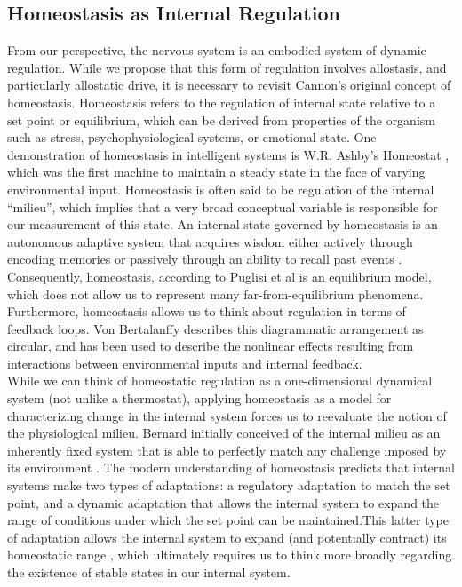 \documentclass{sigchi}
\begin{document}
\subsection{Homeostasis as Internal Regulation}
From our perspective, the nervous system is an embodied system of dynamic regulation. While we propose that this form of regulation involves allostasis, and particularly allostatic drive, it is necessary to revisit Cannon’s \cite{Cannon:1930:TWB} original concept of homeostasis. Homeostasis refers to the regulation of internal state relative to a set point or equilibrium, which can be derived from properties of the organism such as stress, psychophysiological systems, or emotional state. One demonstration of homeostasis in intelligent systems is W.R. Ashby’s Homeostat \cite{Ashby:1960:DFB}, which was the first machine to maintain a steady state in the face of varying environmental input.  Homeostasis is often said to be regulation of the internal “milieu”, which implies that a very broad conceptual variable is responsible for our measurement of this state. An internal state governed by homeostasis is an autonomous adaptive system that acquires wisdom either actively through encoding memories or passively through an ability to recall past events \cite{Dworkin:1993:LPR}.  Consequently, homeostasis, according to Puglisi et al \cite{puglisi} is an equilibrium model, which does not allow us to represent many far-from-equilibrium phenomena. Furthermore, homeostasis allows us to think about regulation in terms of feedback loops. Von Bertalanffy \cite{Bertalanffy:1968:GST} describes this diagrammatic arrangement as circular, and has been used to describe the nonlinear effects resulting from interactions between environmental inputs and internal feedback.\\
While we can think of homeostatic regulation as a one-dimensional dynamical system (not unlike a thermostat), applying homeostasis as a model for characterizing change in the internal system forces us to reevaluate the notion of the physiological milieu. Bernard initially conceived of the internal milieu as an inherently fixed system that is able to perfectly match any challenge imposed by its environment \cite{gross}. The modern understanding of homeostasis predicts that internal systems make two types of adaptations: a regulatory adaptation to match the set point, and a dynamic adaptation that allows the internal system to expand the range of conditions under which the set point can be maintained.This latter type of adaptation allows the internal system to expand (and potentially contract) its homeostatic range \cite{davies}, which ultimately requires us to think more broadly regarding the existence of stable states in our internal system.
\end{document}
